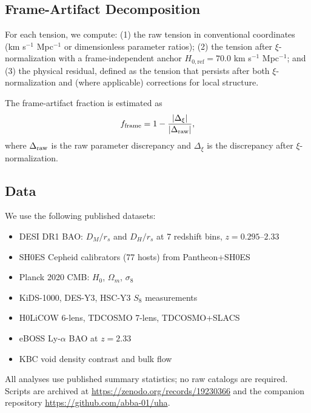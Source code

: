 \documentclass[twocolumn]{aastex631}
\begin{document}
\subsection{Frame-Artifact Decomposition}

For each tension, we compute:
(1) the raw tension in conventional coordinates (km s$^{-1}$ Mpc$^{-1}$ or
dimensionless parameter ratios);
(2) the tension after $\xi$-normalization with a frame-independent anchor
$H_{0,\mathrm{ref}} = 70.0$ km s$^{-1}$ Mpc$^{-1}$;
and (3) the physical residual, defined as the tension that persists after both
$\xi$-normalization and (where applicable) corrections for local structure.

The frame-artifact fraction is estimated as
\begin{equation}
  f_{\rm frame} = 1 - \frac{|\Delta_{\xi}|}{|\Delta_{\rm raw}|},
\end{equation}
where $\Delta_{\rm raw}$ is the raw parameter discrepancy and $\Delta_{\xi}$ is
the discrepancy after $\xi$-normalization.

\subsection{Data}

We use the following published datasets:
\begin{itemize}
  \item DESI DR1 BAO: $D_M/r_s$ and $D_H/r_s$ at 7 redshift bins,
        $z = 0.295$--$2.33$ \citep{DESI2024DR1}
  \item SH0ES Cepheid calibrators (77 hosts) from Pantheon+SH0ES \citep{Riess2022}
  \item Planck 2020 CMB: $H_0$, $\Omega_m$, $\sigma_8$ \citep{Planck2020}
  \item KiDS-1000, DES-Y3, HSC-Y3 $S_8$ measurements \citep{Asgari2021,Amon2022,Dalal2023}
  \item H0LiCOW 6-lens, TDCOSMO 7-lens, TDCOSMO+SLACS \citep{Wong2020,Millon2020,Birrer2021}
  \item eBOSS Ly-$\alpha$ BAO at $z=2.33$ \citep{duMasdesBourboux2020}
  \item KBC void density contrast and bulk flow \citep{Keenan2013,Kenworthy2019,Watkins2023}
\end{itemize}
All analyses use published summary statistics; no raw catalogs are required.
Scripts are archived at \url{https://zenodo.org/records/19230366} and the
companion repository \url{https://github.com/abba-01/uha}.
\end{document}
